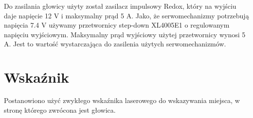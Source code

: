 Do zasilania głowicy użyty został zasilacz impulsowy Redox, który na wyjściu daje napięcie 12 V i maksymalny prąd 5 A. Jako, że serwomechanizmy potrzebują napięcia 7.4 V używamy przetwornicy step-down XL4005E1 o regulowanym napięciu wyjściowym. Maksymalny prąd wyjściowy użytej przetwornicy wynosi 5 A. Jest to wartość wystarczająca do zasilenia użytych serwomechanizmów.

\section{Wskaźnik}
\label{sec:wskaznik}

Postanowiono użyć zwykłego wskaźnika laserowego do wskazywania miejsca, w stronę którego zwrócona jest głowica.